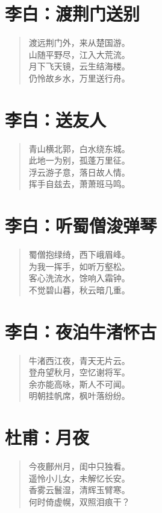 \documentclass[12pt,oneside]{book}
\newenvironment{shici}{%
\begin{verse}\centering\yanti\large\hspace{12pt}}{\end{verse}}
\begin{document}
\begin{common-format}
\chapter{李白：渡荆门送别}
\begin{shici}
渡远荆门外，来从楚国游。\\
山随平野尽，江入大荒流。\\
月下飞天镜，云生结海楼。\\
仍怜故乡水，万里送行舟。
\end{shici}

\chapter{李白：送友人}
\begin{shici}
青山横北郭，白水绕东城。\\
此地一为别，孤蓬万里征。\\
浮云游子意，落日故人情。\\
挥手自兹去，萧萧班马鸣。
\end{shici}

\chapter{李白：听蜀僧浚弹琴}
\begin{shici}
蜀僧抱绿绮，西下峨眉峰。\\
为我一挥手，如听万壑松。\\
客心洗流水，馀响入霜钟。\\
不觉碧山暮，秋云暗几重。
\end{shici}

\chapter{李白：夜泊牛渚怀古}
\begin{shici}
牛渚西江夜，青天无片云。\\
登舟望秋月，空忆谢将军。\\
余亦能高咏，斯人不可闻。\\
明朝挂帆席，枫叶落纷纷。
\end{shici}

\chapter{杜甫：月夜}
\begin{shici}
今夜鄜州月，闺中只独看。\\
遥怜小儿女，未解忆长安。\\
香雾云鬟湿，清辉玉臂寒。\\
何时倚虚幌，双照泪痕干？
\end{shici}


\end{common-format}
\end{document}
